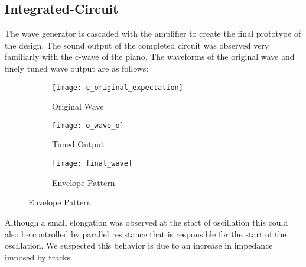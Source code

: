\subsection{Integrated-Circuit}
The wave generator is cascaded with the amplifier to create the final prototype of the design. The sound output of the completed circuit was observed very familiarly with the c-wave of the piano. The waveforms of the original wave and finely tuned wave output are as follows:
\begin{figure}[h]
    \begin{subfigure}{.48\columnwidth}
        \centering
        \texttt{[image: c\_original\_expectation]}
        \caption*{Original Wave}
    \end{subfigure}
    \begin{subfigure}{.48\columnwidth}
        \texttt{[image: o\_wave\_o]}
        \caption*{Tuned Output}
    \end{subfigure}
    \begin{subfigure}{\columnwidth}
        \centering
        \texttt{[image: final\_wave]}
        \caption*{Envelope Pattern}
    \end{subfigure}
\end{figure}
Although a small elongation was observed at the start of oscillation this could also be controlled by parallel resistance that is responsible for the start of the oscillation. We suspected this behavior is due to an increase in impedance imposed by tracks.